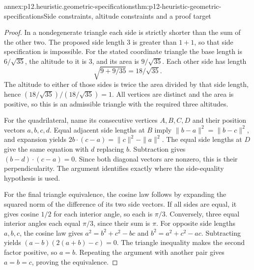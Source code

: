 \begin{annexitem}{annex:p12.heuristic.geometric-specifications}{thm:p12-heuristic-geometric-specifications}{Side constraints, altitude constraints and a proof target}
\begin{proof}
In a nondegenerate triangle each side is strictly shorter than
the sum of the other two. The proposed side length \(3\) is
greater than \(1+1\), so that side specification is impossible.
For the stated coordinate triangle the base length is
\(6/\sqrt{35}\), the altitude to it is \(3\), and its area
is \(9/\sqrt{35}\). Each other side has length
\[
       \sqrt{9+9/35}=18/\sqrt{35}.
\]
The altitude to either of those sides is twice the area divided
by that side length, hence
\((18/\sqrt{35})/(18/\sqrt{35})=1\). All vertices are distinct
and the area is positive, so this is an admissible triangle with
the required three altitudes.

For the quadrilateral, name its consecutive vertices \(A,B,C,D\)
and their position vectors \(a,b,c,d\). Equal adjacent side
lengths at \(B\) imply
\(\|b-a\|^2=\|b-c\|^2\), and expansion yields
\(2b\cdot(c-a)=\|c\|^2-\|a\|^2\).
The equal side lengths at \(D\) give the same equation with
\(d\) replacing \(b\). Subtraction gives
\((b-d)\cdot(c-a)=0\). Since both diagonal vectors are
nonzero, this is their perpendicularity. The argument identifies
exactly where the side-equality hypothesis is used.

For the final triangle equivalence, the cosine law follows by
expanding the squared norm of the difference of its two side
vectors. If all sides are equal, it gives cosine \(1/2\)
for each interior angle, so each is \(\pi/3\). Conversely,
three equal interior angles each equal \(\pi/3\), since their
sum is \(\pi\). For opposite side lengths \(a,b,c\), the
cosine law gives \(a^2=b^2+c^2-bc\) and
\(b^2=a^2+c^2-ac\). Subtracting yields
\((a-b)(2(a+b)-c)=0\). The triangle inequality makes the
second factor positive, so \(a=b\). Repeating the argument
with another pair gives \(a=b=c\), proving the equivalence.
\end{proof}
\end{annexitem}

